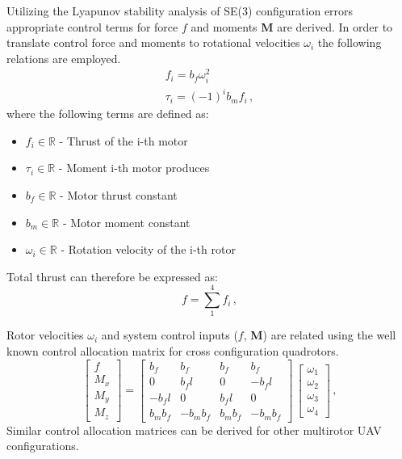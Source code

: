 \noindent Utilizing the Lyapunov stability analysis of SE(3) configuration errors appropriate control terms for force $f$ and moments \textbf{M} are derived. In order to translate control force and moments to rotational velocities $\omega_i$ the following relations are employed.
\begin{gather}
f_i = b_f \omega_{i}^2 \label{force}\\
\tau_i = (-1)^i b_m f_i \, ,
\end{gather}
\noindent where the following terms are defined as:	
\begin{itemize}
	\item $f_i \in \mathbb{R}$ - Thrust of the i-th motor
	
	\item $\tau_i \in \mathbb{R}$ - Moment i-th motor produces
	
	\item $b_f \in \mathbb{R}$ - Motor thrust constant
	
	\item $b_m \in \mathbb{R}$ - Motor moment constant
	
	\item $\omega_i \in \mathbb{R}$ - Rotation velocity of the i-th rotor
\end{itemize}
Total thrust can therefore be expressed as:
\begin{equation}
f = \sum_{1}^{4}f_i \, , \label{control:f}
\end{equation}

\noindent Rotor velocities $\omega_i$ and system control inputs ($f$, \textbf{M}) are related using the well known control allocation matrix for cross configuration quadrotors.
\begin{equation}
       \begin{bmatrix}
               f \\
               M_x \\
               M_y \\
               M_z
       \end{bmatrix} = 
       \begin{bmatrix}
               b_f     &       b_f     &       b_f     &       b_f     \\
               0       &       b_f l   &       0       & -b_f l \\
               -b_f l  &       0       &       b_f l   &       0       \\
               b_m b_f &       -b_m b_f        & b_m b_f       & -b_m b_f
       \end{bmatrix} \,
       \begin{bmatrix}
               \omega_1 \\
               \omega_2 \\
               \omega_3 \\
               \omega_4
       \end{bmatrix} \, ,
\end{equation}
\noindent Similar control allocation matrices can be derived for other multirotor UAV configurations.

